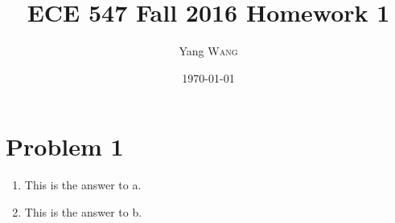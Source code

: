 \documentclass{article}
\title{ECE 547 Fall 2016 Homework 1} %
\author{Yang \textsc{Wang}} %
\date{\today} %
\begin{document}
\maketitle %


\section{Problem 1}
	\begin{enumerate}[label=\alph*]
		\item This is the answer to a.
		\item This is the answer to b.
	\end{enumerate}
\end{document}
